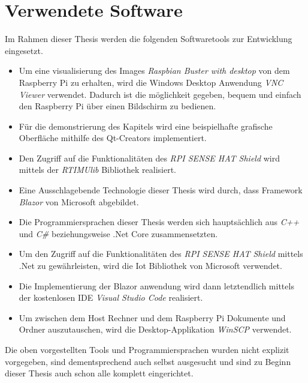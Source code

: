 \section{Verwendete Software}
\label{sec:verwendeteSoftware}
Im Rahmen dieser Thesis werden die folgenden Softwaretools zur Entwicklung eingesetzt.
\begin{itemize}
    \item Um eine visualisierung des Images \emph{Raspbian Buster with desktop} von dem Raspberry
    Pi zu erhalten, wird die Windows Desktop Anwendung \emph{VNC Viewer} verwendet. Dadurch ist
    die möglichkeit gegeben, bequem und einfach den Raspberry Pi über einen Bildschirm zu bedienen.
    \item Für die demonstrierung des Kapitels \emph{} wird eine
    beispielhafte grafische Oberfläche mithilfe des Qt-Creators implementiert.
    \item Den Zugriff auf die Funktionalitäten des \emph{RPI SENSE HAT Shield} wird mittels der
    \emph{RTIMUlib} Bibliothek realisiert.
    \item Eine Ausschlagebende Technologie dieser Thesis wird durch, dass Framework \emph{Blazor}
    von Microsoft abgebildet.
    \item Die Programmiersprachen dieser Thesis werden sich hauptsächlich aus \emph{C++} und
    \emph{C\#} beziehungsweise .Net Core zusammensetzten.
    \item Um den Zugriff auf die Funktionalitäten des \emph{RPI SENSE HAT Shield} mittels .Net zu
    gewährleisten, wird die Iot Bibliothek von Microsoft verwendet.
    \item Die Implementierung der Blazor anwendung wird dann letztendlich mittels der kostenlosen
    IDE \emph{Visual Studio Code} realisiert.
    \item Um zwischen dem Host Rechner und dem Raspberry Pi Dokumente und Ordner auszutauschen,
    wird die Desktop-Applikation \emph{WinSCP} verwendet.
\end{itemize}

Die oben vorgestellten Tools und Programmiersprachen wurden nicht explizit vorgegeben, sind
dementsprechend auch selbst ausgesucht und sind zu Beginn dieser Thesis auch schon alle komplett
eingerichtet.